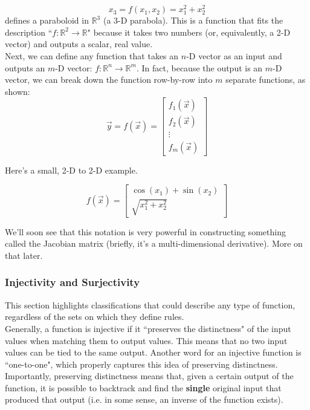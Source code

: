 \documentclass{article}
\begin{document}
\[x_3 = f(x_1,x_2) = x_1^2 + x_2^2\]
defines a paraboloid in $\mathbb{R}^3$ (a 3-D parabola). This is a function that fits the description ``$f: \mathbb{R}^2 \to \mathbb{R}$" because it takes two numbers (or, equivalently, a 2-D vector) and outputs a scalar, real value. \\

Next, we can define any function that takes an $n$-D vector as an input and outputs an $m$-D vector: $f: \mathbb{R}^n \to \mathbb{R}^m$. In fact, because the output is an $m$-D vector, we can break down the function row-by-row into $m$ separate functions, as shown:
\[\vec{y} = f\left(\vec{x}\right) = \begin{bmatrix} f_{1}\left(\vec{x}\right) \\ f_{2}\left(\vec{x}\right) \\ \vdots \\ f_{m}\left(\vec{x}\right)\end{bmatrix}\]

Here's a small, 2-D to 2-D example.

\begin{equation}
f\left(\vec{x}\right) = \begin{bmatrix} \cos(x_1) + \sin (x_2) \\ \sqrt{x_1^2 + x_2^2}\end{bmatrix}
\end{equation}

We'll soon see that this notation is very powerful in constructing something called the Jacobian matrix (briefly, it's a multi-dimensional derivative). More on that later.

\subsubsection{Injectivity and Surjectivity}

This section highlights classifications that could describe any type of function, regardless of the sets on which they define rules. \\

Generally, a function is injective if it ``preserves the distinctness" of the input values when matching them to output values. This means that no two input values can be tied to the same output. Another word for an injective function is ``one-to-one", which properly captures this idea of preserving distinctness. Importantly, preserving distinctness means that, given a certain output of the function, it is possible to backtrack and find the \textbf{single} original input that produced that output (i.e. in some sense, an inverse of the function exists). \\
\end{document}
